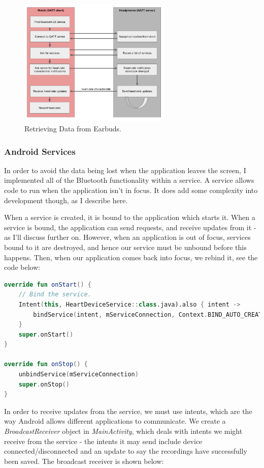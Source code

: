 \documentclass[12pt,a4paper,twoside,openany]{report}
\begin{document}
\begin{figure}[H]
	\centerline{\includegraphics[width=0.65\textwidth]{figs/gatt-flow.png}}
	\caption{Retrieving Data from Earbuds.}
	\label{fig:gatt-flow}
\end{figure}

\subsubsection{Android Services}

In order to avoid the data being lost when the application leaves the screen,
I implemented all of the Bluetooth functionality within a service. A service
allows code to run when the application isn't in focus. It does add some
complexity into development though, as I describe here.

When a service is created, it is bound to the application which starts it.
When a service is bound, the application can send requests, and receive
updates from it - as I'll discuss further on. However, when an application is
out of focus, services bound to it are destroyed, and hence our service must
be unbound before this happens. Then, when our application comes back into
focus, we rebind it, see the code below:

\begin{lstlisting}[language=Kotlin]
override fun onStart() {
    // Bind the service.
    Intent(this, HeartDeviceService::class.java).also { intent ->
        bindService(intent, mServiceConnection, Context.BIND_AUTO_CREATE)
    }
    super.onStart()
}

override fun onStop() {
    unbindService(mServiceConnection)
    super.onStop()
}
\end{lstlisting}

In order to receive updates from the service, we must use intents, which are
the way Android allows different applications to communicate. 
We create a \emph{BroadcastReceiver}
object in \emph{MainActivity}, which deals with intents we might receive from
the service - the intents it may send include device connected/disconnected
and an update to say the recordings have successfully been saved. The
broadcast receiver is shown below:
\end{document}
